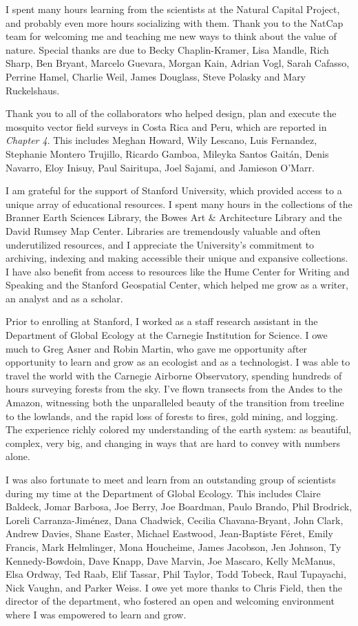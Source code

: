 I spent many hours learning from the scientists at the Natural Capital Project, and probably even more hours socializing with them. Thank you to the NatCap team for welcoming me and teaching me new ways to think about the value of nature. Special thanks are due to Becky Chaplin-Kramer, Lisa Mandle, Rich Sharp, Ben Bryant, Marcelo Guevara, Morgan Kain, Adrian Vogl, Sarah Cafasso, Perrine Hamel, Charlie Weil, James Douglass, Steve Polasky and Mary Ruckelshaus.

Thank you to all of the collaborators who helped design, plan and execute the mosquito vector field surveys in Costa Rica and Peru, which are reported in \textit{Chapter 4}. This includes Meghan Howard, Wily Lescano, Luis Fernandez, Stephanie Montero Trujillo, Ricardo Gamboa, Mileyka Santos Gaitán, Denis Navarro, Eloy Inisuy, Paul Sairitupa, Joel Sajami, and Jamieson O'Marr.

I am grateful for the support of Stanford University, which provided access to a unique array of educational resources. I spent many hours in the collections of the Branner Earth Sciences Library, the Bowes Art \& Architecture Library and the David Rumsey Map Center. Libraries are tremendously valuable and often underutilized resources, and I appreciate the University's commitment to archiving, indexing and making accessible their unique and expansive collections. I have also benefit from access to resources like the Hume Center for Writing and Speaking and the Stanford Geospatial Center, which helped me grow as a writer, an analyst and as a scholar.

Prior to enrolling at Stanford, I worked as a staff research assistant in the Department of Global Ecology at the Carnegie Institution for Science. I owe much to Greg Asner and Robin Martin, who gave me opportunity after opportunity to learn and grow as an ecologist and as a technologist. I was able to travel the world with the Carnegie Airborne Observatory, spending hundreds of hours surveying forests from the sky. I've flown transects from the Andes to the Amazon, witnessing both the unparalleled beauty of the transition from treeline to the lowlands, and the rapid loss of forests to fires, gold mining, and logging. The experience richly colored my understanding of the earth system: as beautiful, complex, very big, and changing in ways that are hard to convey with numbers alone.

I was also fortunate to meet and learn from an outstanding group of scientists during my time at the Department of Global Ecology. This includes Claire Baldeck, Jomar Barbosa, Joe Berry, Joe Boardman, Paulo Brando, Phil Brodrick, Loreli Carranza-Jiménez, Dana Chadwick, Cecilia Chavana-Bryant, John Clark, Andrew Davies, Shane Easter, Michael Eastwood, Jean-Baptiste Féret, Emily Francis, Mark Helmlinger, Mona Houcheime, James Jacobson, Jen Johnson, Ty Kennedy-Bowdoin, Dave Knapp, Dave Marvin, Joe Mascaro, Kelly McManus, Elsa Ordway, Ted Raab, Elif Tassar, Phil Taylor, Todd Tobeck, Raul Tupayachi, Nick Vaughn, and Parker Weiss. I owe yet more thanks to Chris Field, then the director of the department, who fostered an open and welcoming environment where I was empowered to learn and grow.

